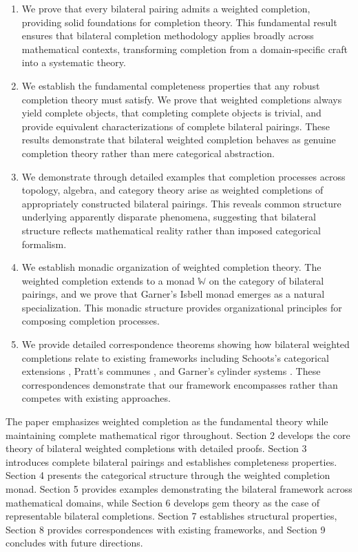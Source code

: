 \documentclass[11pt]{article}
\theoremstyle{plain}
\theoremstyle{definition}
\theoremstyle{remark}
\begin{document}
\begin{enumerate}

\item We prove that every bilateral pairing admits a weighted completion, providing solid foundations for completion theory. This fundamental result ensures that bilateral completion methodology applies broadly across mathematical contexts, transforming completion from a domain-specific craft into a systematic theory.

\item We establish the fundamental completeness properties that any robust completion theory must satisfy. We prove that weighted completions always yield complete objects, that completing complete objects is trivial, and provide equivalent characterizations of complete bilateral pairings. These results demonstrate that bilateral weighted completion behaves as genuine completion theory rather than mere categorical abstraction.

\item We demonstrate through detailed examples that completion processes across topology, algebra, and category theory arise as weighted completions of appropriately constructed bilateral pairings. This reveals common structure underlying apparently disparate phenomena, suggesting that bilateral structure reflects mathematical reality rather than imposed categorical formalism.

\item We establish monadic organization of weighted completion theory. The weighted completion extends to a monad $\mathbb{W}$ on the category of bilateral pairings, and we prove that Garner's Isbell monad emerges as a natural specialization. This monadic structure provides organizational principles for composing completion processes.

\item We provide detailed correspondence theorems showing how bilateral weighted completions relate to existing frameworks including Schoots's categorical extensions \cite{schoots2015generalising}, Pratt's communes \cite{pratt2010communes}, and Garner's cylinder systems \cite{garner2018isbell}. These correspondences demonstrate that our framework encompasses rather than competes with existing approaches.
\end{enumerate}

The paper emphasizes weighted completion as the fundamental theory while maintaining complete mathematical rigor throughout. Section 2 develops the core theory of bilateral weighted completions with detailed proofs. Section 3 introduces complete bilateral pairings and establishes completeness properties. Section 4 presents the categorical structure through the weighted completion monad. Section 5 provides examples demonstrating the bilateral framework across mathematical domains, while Section 6 develops gem theory as the case of representable bilateral completions. Section 7 establishes structural properties, Section 8 provides correspondences with existing frameworks, and Section 9 concludes with future directions.
\end{document}
